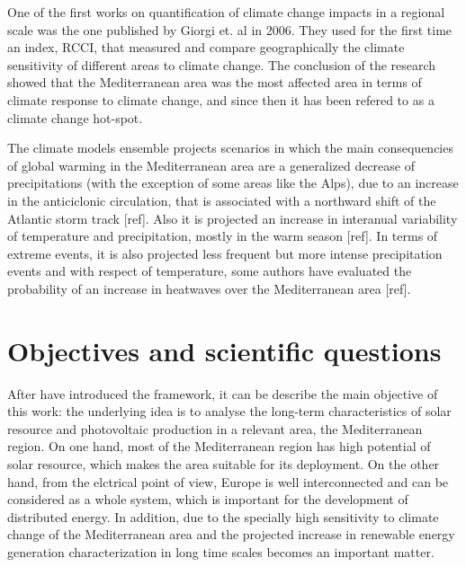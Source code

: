 One of the first works on quantification of climate change impacts in a regional scale was the one published by Giorgi et. al in 2006. They used for the first time an index, RCCI, that measured and compare geographically the climate sensitivity of different areas to climate change. The conclusion of the research showed that the Mediterranean area was the most affected area in terms of climate response to climate change, and since then it has been refered to as a climate change hot-spot.


The climate models ensemble projects scenarios in which the main consequencies of global warming in the Mediterranean area are a generalized decrease of precipitations (with the exception of some areas like the Alps), due to an increase in the anticiclonic circulation, that is associated with a northward shift of the Atlantic storm track [ref]. Also it is projected an increase in interanual variability of temperature and precipitation, mostly in the warm season [ref]. In terms of extreme events, it is also projected less frequent but more intense precipitation events and with respect of temperature, some authors have evaluated the probability of an increase in heatwaves over the Mediterranean area [ref].   

\section{Objectives and scientific questions}%


After have introduced the framework, it can be describe the main objective of this work: the underlying idea is to analyse the long-term characteristics of solar resource and photovoltaic production in a relevant area, the Mediterranean region. On one hand, most of the Mediterranean region has high potential of solar resource, which makes the area suitable for its deployment. On the other hand, from the elctrical point of view, Europe is well interconnected and can be considered as a whole system, which is important for the development of distributed energy. In addition, due to the specially high sensitivity to climate change of the Mediterranean area and the projected increase in renewable energy generation characterization in long time scales becomes an important matter.

